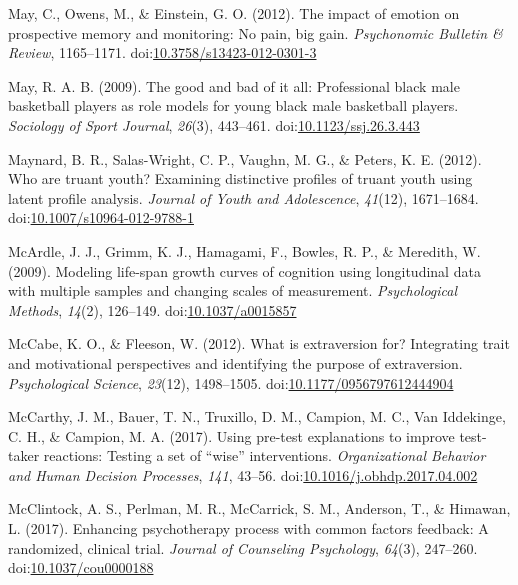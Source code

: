 \documentclass[english,man]{apa6}
\theoremstyle{definition}
\theoremstyle{definition}
\theoremstyle{definition}
\theoremstyle{remark}
\begin{document}
\hypertarget{ref-May2012}{}
May, C., Owens, M., \& Einstein, G. O. (2012). The impact of emotion on
prospective memory and monitoring: No pain, big gain. \emph{Psychonomic
Bulletin \& Review}, 1165--1171.
doi:\href{https://doi.org/10.3758/s13423-012-0301-3}{10.3758/s13423-012-0301-3}

\hypertarget{ref-May2009}{}
May, R. A. B. (2009). The good and bad of it all: Professional black
male basketball players as role models for young black male basketball
players. \emph{Sociology of Sport Journal}, \emph{26}(3), 443--461.
doi:\href{https://doi.org/10.1123/ssj.26.3.443}{10.1123/ssj.26.3.443}

\hypertarget{ref-Maynard2012}{}
Maynard, B. R., Salas-Wright, C. P., Vaughn, M. G., \& Peters, K. E.
(2012). Who are truant youth? Examining distinctive profiles of truant
youth using latent profile analysis. \emph{Journal of Youth and
Adolescence}, \emph{41}(12), 1671--1684.
doi:\href{https://doi.org/10.1007/s10964-012-9788-1}{10.1007/s10964-012-9788-1}

\hypertarget{ref-McArdle2009}{}
McArdle, J. J., Grimm, K. J., Hamagami, F., Bowles, R. P., \& Meredith,
W. (2009). Modeling life-span growth curves of cognition using
longitudinal data with multiple samples and changing scales of
measurement. \emph{Psychological Methods}, \emph{14}(2), 126--149.
doi:\href{https://doi.org/10.1037/a0015857}{10.1037/a0015857}

\hypertarget{ref-McCabe2012}{}
McCabe, K. O., \& Fleeson, W. (2012). What is extraversion for?
Integrating trait and motivational perspectives and identifying the
purpose of extraversion. \emph{Psychological Science}, \emph{23}(12),
1498--1505.
doi:\href{https://doi.org/10.1177/0956797612444904}{10.1177/0956797612444904}

\hypertarget{ref-McCarthy2017}{}
McCarthy, J. M., Bauer, T. N., Truxillo, D. M., Campion, M. C., Van
Iddekinge, C. H., \& Campion, M. A. (2017). Using pre-test explanations
to improve test-taker reactions: Testing a set of ``wise''
interventions. \emph{Organizational Behavior and Human Decision
Processes}, \emph{141}, 43--56.
doi:\href{https://doi.org/10.1016/j.obhdp.2017.04.002}{10.1016/j.obhdp.2017.04.002}

\hypertarget{ref-McClintock2017}{}
McClintock, A. S., Perlman, M. R., McCarrick, S. M., Anderson, T., \&
Himawan, L. (2017). Enhancing psychotherapy process with common factors
feedback: A randomized, clinical trial. \emph{Journal of Counseling
Psychology}, \emph{64}(3), 247--260.
doi:\href{https://doi.org/10.1037/cou0000188}{10.1037/cou0000188}
\end{document}
